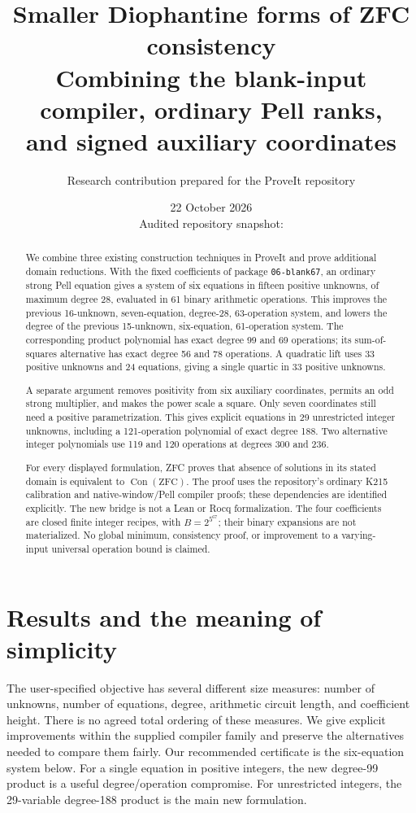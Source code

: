 \documentclass[11pt,a4paper]{article}
\title{\textbf{Smaller Diophantine forms of ZFC consistency}\\[5pt]
\large Combining the blank-input compiler, ordinary Pell ranks,\\
and signed auxiliary coordinates}
\author{Research contribution prepared for the ProveIt repository}
\date{22 October 2026\\[3pt]\small Audited repository snapshot: \pin}
\theoremstyle{remark}\newtheorem{remark}[theorem]{Remark}
\newcommand{\Con}{\operatorname{Con}}
\newcommand{\src}[1]{\nolinkurl{#1}}
\begin{document}
\maketitle
\begin{abstract}
We combine three existing construction techniques in ProveIt and prove
additional domain reductions. With the fixed coefficients of package
\src{06-blank67}, an ordinary strong Pell equation gives a system of six
equations in fifteen positive unknowns, of maximum degree 28, evaluated
in 61 binary arithmetic operations. This improves the previous
16-unknown, seven-equation, degree-28, 63-operation system, and lowers the
degree of the previous 15-unknown, six-equation, 61-operation system.
The corresponding product polynomial has exact degree 99 and 69
operations; its sum-of-squares alternative has exact degree 56 and 78
operations. A quadratic lift uses 33 positive unknowns and 24 equations,
giving a single quartic in 33 positive unknowns.

A separate argument removes positivity from six auxiliary coordinates,
permits an odd strong multiplier, and makes the power scale a square.
Only seven coordinates still need a positive parametrization. This gives
explicit equations in 29 unrestricted integer unknowns, including a
121-operation polynomial of exact degree 188. Two alternative integer
polynomials use 119 and 120 operations at degrees 300 and 236.

For every displayed formulation, ZFC proves that absence of solutions
in its stated domain is equivalent to $\Con(\mathrm{ZFC})$. The proof
uses the repository's ordinary K215 calibration and native-window/Pell
compiler proofs; these dependencies are identified explicitly. The new
bridge is not a Lean or Rocq formalization. The four coefficients are
closed finite integer recipes, with $B=2^{5^{67}}$; their binary
expansions are not materialized. No global minimum, consistency proof,
or improvement to a varying-input universal operation bound is claimed.
\end{abstract}
\clearpage\tableofcontents\clearpage

\section{Results and the meaning of simplicity}
The user-specified objective has several different size measures:
number of unknowns, number of equations, degree, arithmetic circuit
length, and coefficient height. There is no agreed total ordering of
these measures. We give explicit improvements within the supplied
compiler family and preserve the alternatives needed to compare them
fairly. Our recommended certificate is the six-equation system below.
For a single equation in positive integers, the new degree-99 product
is a useful degree/operation compromise. For unrestricted integers, the
29-variable degree-188 product is the main new formulation.
\end{document}
